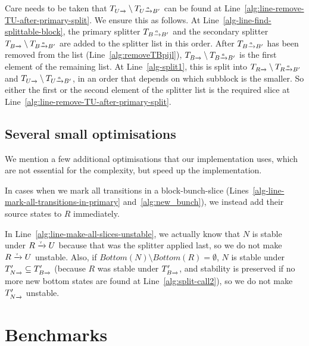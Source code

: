 \documentclass[a4paper,10pt]{article}
\theoremstyle{definition}
\theoremstyle{plain}
\newcommand{\pijl}[1]{\mathrel{\text{$\xrightarrow{\smash[t]{#1}}$}}}
\newcommand{\TB}{T_{B\pijl{}}}
\newcommand{\TBaB}{T_{B\pijl{a} B'}}
\newcommand{\Bottom}{\mathit{Bottom}}
\begin{document}
Care needs to be taken that $T_{U\pijl{}} \setminus T_{U\pijl{a} B'}$ can be found at Line~\ref{alg:line-remove-TU-after-primary-split}.
We ensure this as follows.
At Line~\ref{alg-line-find-splittable-block}, the primary splitter $\TBaB$ and the secondary splitter $\TB \setminus \TBaB$ are added to the splitter list in this order.
After $\TBaB$ has been removed from the list (Line~\ref{alg:removeTBpijl}),
$\TB \setminus \TBaB$ is the first element of the remaining list.
At Line~\ref{alg-split1}, this is split into $T_{R\pijl{}} \setminus T_{R\pijl{a} B'}$ and $T_{U\pijl{}} \setminus T_{U\pijl{a} B'}$,
in an order that depends on which subblock is the smaller.
So either the first or the second element of the splitter list is the required slice at Line~\ref{alg:line-remove-TU-after-primary-split}.

\subsection{Several small optimisations}

We mention a few additional optimisations that our implementation uses, which are not essential for the complexity,
but speed up the implementation.

In cases when we mark all transitions in a block-bunch-slice (Lines~\ref{alg-line-mark-all-transitions-in-primary} and~\ref{alg:new_bunch}),
we instead add their source states to $R$ immediately.

In Line~\ref{alg:line-make-all-slices-unstable},
we actually know that $N$ is stable under $R \pijl{\tau} U$ because that was the splitter applied last,
so we do not make $R \pijl{\tau} U$ unstable.
Also, if $\Bottom(N) \setminus \Bottom(R) = \emptyset$, $N$ is stable under $T'_{N \pijl{}} \subseteq \TB'$
(because $R$ was stable under $\TB'$,
and stability is preserved
if no more new bottom states are found at Line~\ref{alg:split-call2}),
so we do not make $T'_{N \pijl{}}$ unstable.



\section{Benchmarks}
\label{sec:benchmarks}
\end{document}
